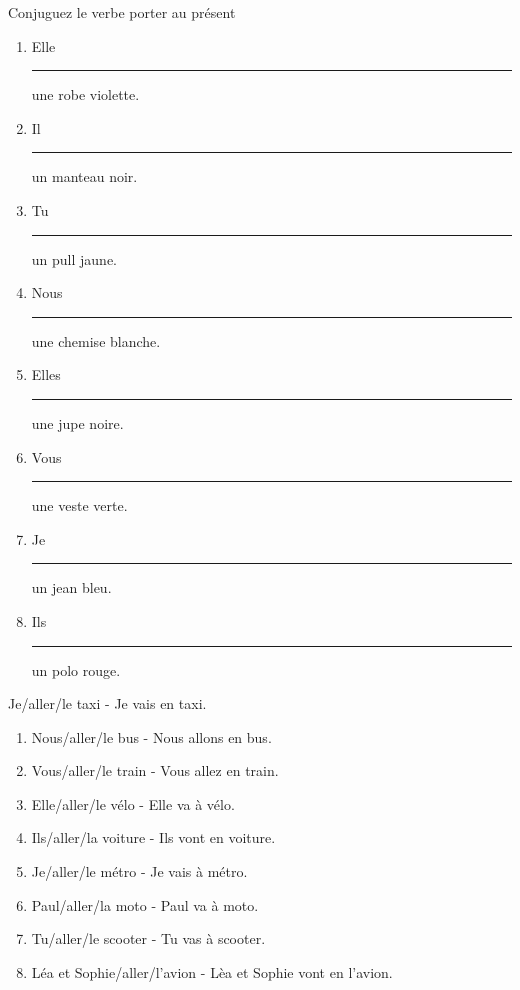 \documentclass[./templates/main.tex]{subfiles}
\begin{document}
\begin{practice}Conjuguez le verbe porter au présent
  \begin{enumerate}[label=(\arabic*)]
    \item Elle \rule{5em}{0.3mm} une robe violette.
    \item Il  \rule{5em}{0.3mm} un manteau noir.
    \item Tu  \rule{5em}{0.3mm} un pull jaune.
    \item Nous  \rule{5em}{0.3mm} une chemise blanche.
    \item Elles  \rule{5em}{0.3mm} une jupe noire.
    \item Vous  \rule{5em}{0.3mm} une veste verte.
    \item Je  \rule{5em}{0.3mm} un jean bleu.
    \item Ils  \rule{5em}{0.3mm} un polo rouge.
  \end{enumerate}
\end{practice}
\begin{practice}Je/aller/le taxi - Je vais en taxi.
  \begin{enumerate}[label=(\arabic*)]
    \item Nous/aller/le bus - Nous allons en bus.
    \item Vous/aller/le train - Vous allez en train.
    \item Elle/aller/le vélo - Elle va à vélo.
    \item Ils/aller/la voiture - Ils vont en voiture.
    \item Je/aller/le métro - Je vais à métro.
    \item Paul/aller/la moto - Paul va à moto.
    \item Tu/aller/le scooter - Tu vas à scooter.
    \item Léa et Sophie/aller/l’avion - Lèa et Sophie vont en l'avion.
  \end{enumerate}
\end{practice}
\end{document}
